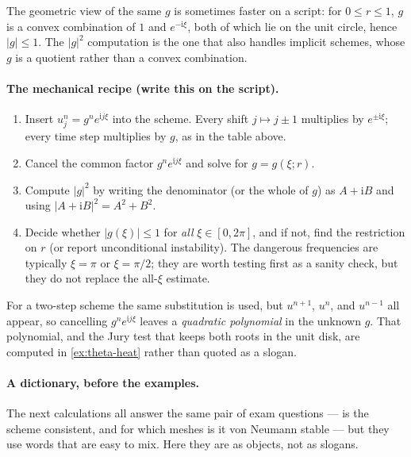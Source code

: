 \documentclass[11pt,a4paper]{article}
\begin{document}
The geometric view of the same \(g\) is sometimes faster on a script: for \(0\le r\le 1\), \(g\) is a convex combination of \(1\) and \(e^{-\mathrm i\xi}\), both of which lie on the unit circle, hence \(\lvert g\rvert\le 1\). The \(\lvert g\rvert^2\) computation is the one that also handles implicit schemes, whose \(g\) is a quotient rather than a convex combination.

\paragraph{The mechanical recipe (write this on the script).}

\begin{enumerate}[label=\textup{\arabic*.}]
    \item Insert \(u_j^n=g^n e^{\mathrm i j\xi}\) into the scheme. Every shift \(j\mapsto j\pm 1\) multiplies by \(e^{\pm\mathrm i\xi}\); every time step multiplies by \(g\), as in the table above.
    \item Cancel the common factor \(g^n e^{\mathrm i j\xi}\) and solve for \(g=g(\xi;r)\).
    \item Compute \(\lvert g\rvert^2\) by writing the denominator (or the whole of \(g\)) as \(A+\mathrm i B\) and using \(\lvert A+\mathrm i B\rvert^2=A^2+B^2\).
    \item Decide whether \(\lvert g(\xi)\rvert\le 1\) for \emph{all} \(\xi\in[0,2\pi]\), and if not, find the restriction on \(r\) (or report unconditional instability). The dangerous frequencies are typically \(\xi=\pi\) or \(\xi=\pi/2\); they are worth testing first as a sanity check, but they do not replace the all-\(\xi\) estimate.
\end{enumerate}

For a two-step scheme the same substitution is used, but \(u^{n+1}\), \(u^n\), and \(u^{n-1}\) all appear, so cancelling \(g^n e^{\mathrm i j\xi}\) leaves a \emph{quadratic polynomial} in the unknown \(g\). That polynomial, and the Jury test that keeps both roots in the unit disk, are computed in \cref{ex:theta-heat} rather than quoted as a slogan.

\paragraph{A dictionary, before the examples.}

The next calculations all answer the same pair of exam questions --- is the scheme consistent, and for which meshes is it von Neumann stable --- but they use words that are easy to mix. Here they are as objects, not as slogans.
\end{document}
